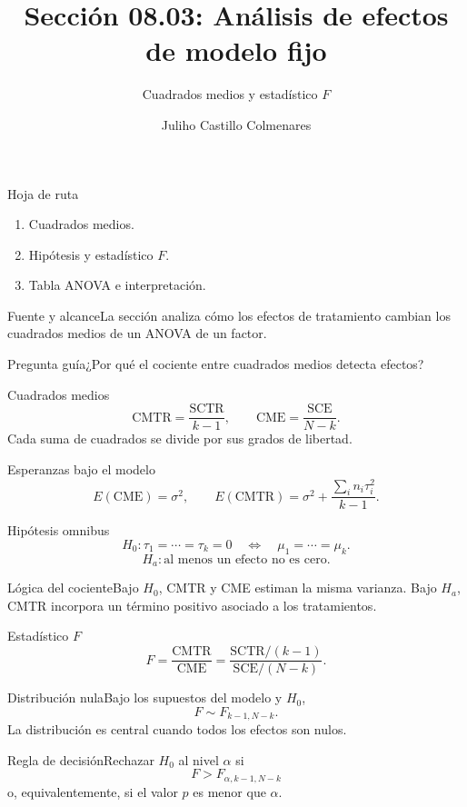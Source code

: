 \documentclass[10pt,aspectratio=169]{beamer}
\title[Efectos de modelo fijo]{Sección 08.03: Análisis de efectos de modelo fijo}\subtitle{Cuadrados medios y estadístico $F$}
\author[J. Castillo Colmenares]{Juliho Castillo Colmenares}\institute{Tecnológico de Monterrey}\date{}
\begin{document}
\begin{frame}[plain]\titlepage\end{frame}
\begin{frame}{Hoja de ruta}\small\begin{enumerate}\item Cuadrados medios.\item Hipótesis y estadístico $F$.\item Tabla ANOVA e interpretación.\end{enumerate}\end{frame}
\begin{frame}{Fuente y alcance}\small La sección analiza cómo los efectos de tratamiento cambian los cuadrados medios de un ANOVA de un factor.\begin{block}{Pregunta guía}¿Por qué el cociente entre cuadrados medios detecta efectos?\end{block}\end{frame}
\begin{frame}{Cuadrados medios}\small\[\text{CMTR}=\frac{\text{SCTR}}{k-1},\qquad \text{CME}=\frac{\text{SCE}}{N-k}.\]Cada suma de cuadrados se divide por sus grados de libertad.\end{frame}
\begin{frame}{Esperanzas bajo el modelo}\small\[E(\text{CME})=\sigma^2,\qquad E(\text{CMTR})=\sigma^2+\frac{\sum_i n_i\tau_i^2}{k-1}.\]\end{frame}
\begin{frame}{Hipótesis omnibus}\small\[H_0:\tau_1=\cdots=\tau_k=0\quad\Longleftrightarrow\quad\mu_1=\cdots=\mu_k.\]\[H_a:\text{al menos un efecto no es cero}.\]\end{frame}
\begin{frame}{Lógica del cociente}\small Bajo $H_0$, CMTR y CME estiman la misma varianza. Bajo $H_a$, CMTR incorpora un término positivo asociado a los tratamientos.\end{frame}
\begin{frame}{Estadístico $F$}\small\[F=\frac{\text{CMTR}}{\text{CME}}=\frac{\text{SCTR}/(k-1)}{\text{SCE}/(N-k)}.\]\end{frame}
\begin{frame}{Distribución nula}\small Bajo los supuestos del modelo y $H_0$,\[F\sim F_{k-1,N-k}.\]La distribución es central cuando todos los efectos son nulos.\end{frame}
\begin{frame}{Regla de decisión}\small Rechazar $H_0$ al nivel $\alpha$ si\[F>F_{\alpha,k-1,N-k}\]o, equivalentemente, si el valor $p$ es menor que $\alpha$.\end{frame}
\end{document}

